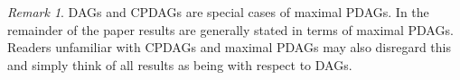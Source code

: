 \documentclass[11pt,a4paper]{article}
\theoremstyle{definition}
\theoremstyle{remark}
\newtheorem{Remark}[Satz]{Remark}
\newcommand{\mpdag}{maximal PDAG}
\newcommand{\Mpdag}{Maximal PDAG}
\newcommand{\g}[1][G]{\mathcal{#1}}
\begin{document}


%
%
%
%


\begin{Remark}
	DAGs and CPDAGs are special cases of \mpdag{}s. In the remainder of the paper results are generally stated in terms of \mpdag{}s. Readers unfamiliar with CPDAGs and \mpdag{}s may also disregard this and simply think of all results as being with respect to DAGs. 
\end{Remark}

\end{document}
